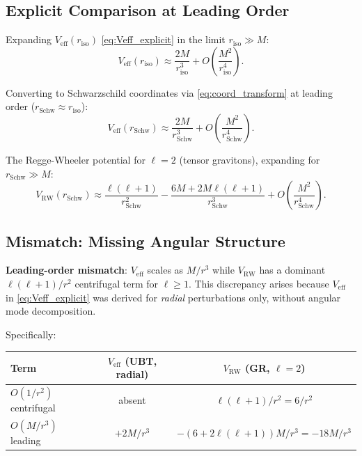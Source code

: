 \documentclass[12pt]{article}
\theoremstyle{definition}
\theoremstyle{remark}
\begin{document}
\subsection{Explicit Comparison at Leading Order}

Expanding $V_{\text{eff}}(r_{\text{iso}})$ \eqref{eq:Veff_explicit} in
the limit $r_{\text{iso}} \gg M$:
\begin{equation}
  V_{\text{eff}}(r_{\text{iso}}) \approx \frac{2M}{r_{\text{iso}}^3}
  + O\!\left(\frac{M^2}{r_{\text{iso}}^4}\right).
  \label{eq:Veff_leading}
\end{equation}

Converting to Schwarzschild coordinates via \eqref{eq:coord_transform}
at leading order ($r_{\text{Schw}} \approx r_{\text{iso}}$):
\begin{equation}
  V_{\text{eff}}(r_{\text{Schw}}) \approx \frac{2M}{r_{\text{Schw}}^3}
  + O\!\left(\frac{M^2}{r_{\text{Schw}}^4}\right).
  \label{eq:Veff_Schw}
\end{equation}

The Regge-Wheeler potential for $\ell = 2$ (tensor gravitons),
expanding for $r_{\text{Schw}} \gg M$:
\begin{equation}
  V_{\text{RW}}(r_{\text{Schw}}) \approx \frac{\ell(\ell+1)}{r_{\text{Schw}}^2}
  - \frac{6M + 2M\ell(\ell+1)}{r_{\text{Schw}}^3}
  + O\!\left(\frac{M^2}{r_{\text{Schw}}^4}\right).
  \label{eq:Vrw_expanded}
\end{equation}

\subsection{Mismatch: Missing Angular Structure}

\textbf{Leading-order mismatch}: $V_{\text{eff}}$ scales as $M/r^3$
while $V_{\text{RW}}$ has a dominant $\ell(\ell+1)/r^2$ centrifugal term
for $\ell \geq 1$.  This discrepancy arises because $V_{\text{eff}}$ in
\eqref{eq:Veff_explicit} was derived for \emph{radial} perturbations only,
without angular mode decomposition.

Specifically:
\begin{center}
\begin{tabular}{|l|c|c|}
\hline
\textbf{Term} & $V_{\text{eff}}$ (UBT, radial) & $V_{\text{RW}}$ (GR, $\ell=2$) \\
\hline
$O(1/r^2)$ centrifugal & absent & $\ell(\ell+1)/r^2 = 6/r^2$ \\
$O(M/r^3)$ leading & $+2M/r^3$ & $-(6+2\ell(\ell+1))M/r^3 = -18M/r^3$ \\
\hline
\end{tabular}
\end{center}
\end{document}
